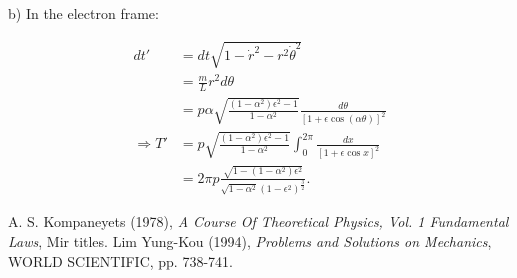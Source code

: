 \documentclass[12pt]{article}
\begin{document}
b) In the electron frame: 

\begin{align*}
	dt' & = dt \sqrt{ 1 - \dot{r}^2 - r^2 \dot{\theta}^2 } \\
	& = \frac{m}{L} r^2 d \theta \\
	& = p \alpha \sqrt{ \frac{ \left( 1 - \alpha^2 \right) \epsilon^2 - 1}{ 1 - \alpha^2 }} \frac{d \theta}{ \left[ 1 + \epsilon \cos \left( \alpha \theta \right) \right]^2 } \\
	\Rightarrow T' & = p \sqrt{ \frac{ \left( 1 - \alpha^2 \right) \epsilon^2 - 1}{ 1 - \alpha^2 }} \int_0^{2 \pi} \frac{dx}{  \left[ 1 + \epsilon \cos x \right]^2} \\
	& = 2 \pi p \frac{ \sqrt{ 1 - \left( 1 - \alpha^2 \right) \epsilon^2 } }{ \sqrt{1 - \alpha^2} \left( 1 - \epsilon^2 \right)^{\frac{3}{2}} } .
\end{align*}	




\begin{thebibliography}{2}
	  A. S. Kompaneyets (1978), \textit{A Course Of Theoretical Physics, Vol. 1 Fundamental Laws}, Mir titles.
	  Lim Yung-Kou (1994), \textit{Problems and Solutions on Mechanics}, WORLD SCIENTIFIC, pp. 738-741.
\end{thebibliography}	
	
\end{document}
